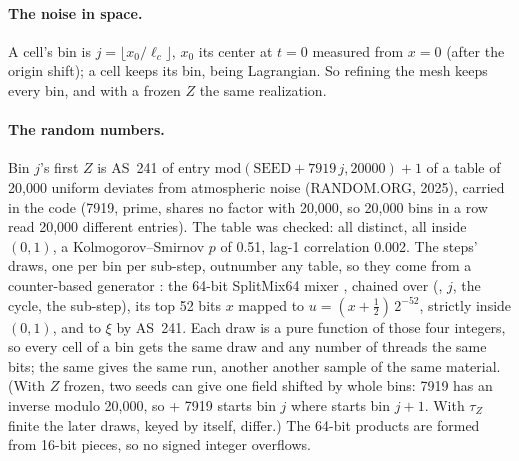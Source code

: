 \paragraph{The noise in space.} A cell's bin is $j = \lfloor x_0/\ell_c
\rfloor$, $x_0$ its center at $t = 0$ measured from $x = 0$ (after the
origin shift); a cell keeps its bin, being Lagrangian. So refining the mesh
keeps every bin, and with a frozen $Z$ the same realization.

\paragraph{The random numbers.} Bin $j$'s first $Z$ is AS~241
\cite{wichura1988} of entry $\mathrm{mod}(\mathrm{SEED} + 7919\,j, 20000) +
1$ of a table of 20,000 uniform deviates from atmospheric noise
(RANDOM.ORG, 2025), carried in the code (7919, prime, shares no factor with
20,000, so 20,000 bins in a row read 20,000 different entries). The table
was checked: all distinct, all inside $(0, 1)$, a Kolmogorov--Smirnov $p$
of 0.51, lag-1 correlation 0.002. The steps' draws, one per bin per
sub-step, outnumber any table, so they come from a counter-based generator
\cite{salmon2011}: the 64-bit SplitMix64 mixer \cite{steele2014}, chained
over (, $j$, the cycle, the sub-step), its top 52 bits $x$ mapped
to $u = (x + \tfrac12)\,2^{-52}$, strictly inside $(0, 1)$, and to $\xi$ by
AS~241. Each draw is a pure function of those four integers, so every cell
of a bin gets the same draw and any number of threads the same bits; the
same  gives the same run, another  another sample of
the same material. (With $Z$ frozen, two seeds can give one field shifted by
whole bins: 7919 has an inverse modulo 20,000, so  + 7919 starts
bin $j$ where  starts bin $j + 1$. With $\tau_Z$ finite the later
draws, keyed by  itself, differ.) The 64-bit products are formed from 16-bit pieces, so
no signed integer overflows.

